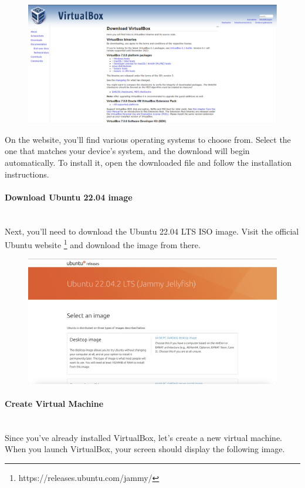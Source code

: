 \documentclass{article}
\begin{document}
\begin{figure}[H]
    \centering
    \includegraphics[width=\textwidth]{img/2./virtual_box_website.png}
\end{figure}

\noindent
On the website, you'll find various operating systems to choose from. Select the one that matches your device's system, and the download will begin automatically. To install it, open the downloaded file and follow the installation instructions.\\

\paragraph{Download Ubuntu 22.04 image}~\\
Next, you'll need to download the Ubuntu 22.04 LTS ISO image. Visit the official Ubuntu website \footnote{https://releases.ubuntu.com/jammy/} and download the image from there.

\begin{figure}[H]
    \centering
    \includegraphics[width=\textwidth]{img/2./ubuntu_website.png}
\end{figure}

\paragraph{Create Virtual Machine}~\\
Since you've already installed VirtualBox, let's create a new virtual machine. When you launch VirtualBox, your screen should display the following image.
\end{document}
